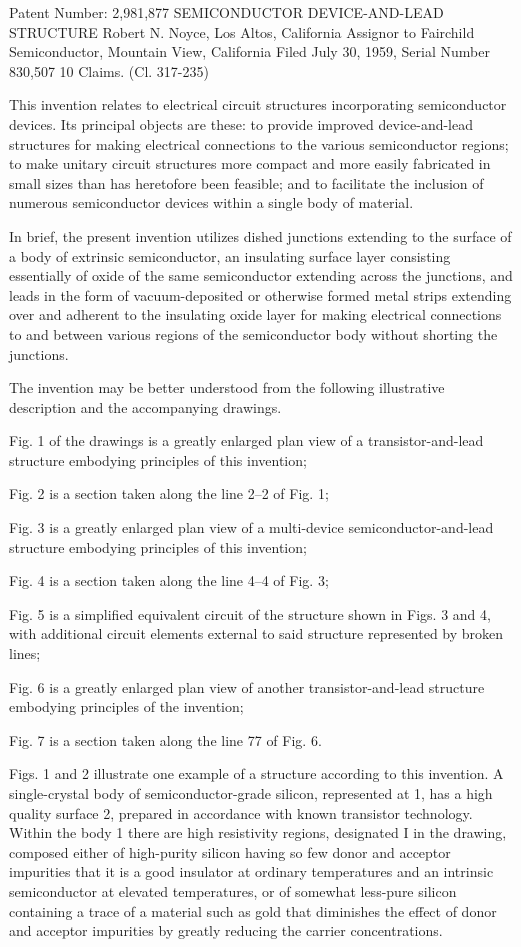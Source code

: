 Patent Number: 2,981,877
SEMICONDUCTOR DEVICE-AND-LEAD STRUCTURE
Robert N. Noyce, Los Altos, California
Assignor to Fairchild Semiconductor, Mountain View, California
Filed July 30, 1959, Serial Number 830,507
10 Claims. (Cl. 317-235)

This invention relates to electrical circuit structures incorporating semiconductor devices. Its principal objects are these: to provide improved device-and-lead structures for making electrical connections to the various semiconductor regions; to make unitary circuit structures more compact and more easily fabricated in small sizes than has heretofore been feasible; and to facilitate the inclusion of numerous semiconductor devices within a single body of material.

In brief, the present invention utilizes dished junctions extending to the surface of a body of extrinsic semiconductor, an insulating surface layer consisting essentially of oxide of the same semiconductor extending across the junctions, and leads in the form of vacuum-deposited or otherwise formed metal strips extending over and adherent to the insulating oxide layer for making electrical connections to and between various regions of the semiconductor body without shorting the junctions.

The invention may be better understood from the following illustrative description and the accompanying drawings.

Fig. 1 of the drawings is a greatly enlarged plan view of a transistor-and-lead structure embodying principles of this invention;

Fig. 2 is a section taken along the line 2--2 of Fig. 1;

Fig. 3 is a greatly enlarged plan view of a multi-device semiconductor-and-lead structure embodying principles of this invention;

Fig. 4 is a section taken along the line 4--4 of Fig. 3;

Fig. 5 is a simplified equivalent circuit of the structure shown in Figs. 3 and 4, with additional circuit elements external to said structure represented by broken lines;

Fig. 6 is a greatly enlarged plan view of another transistor-and-lead structure embodying principles of the invention;

Fig. 7 is a section taken along the line 77 of Fig. 6.

Figs. 1 and 2 illustrate one example of a structure according to this invention. A single-crystal body of semiconductor-grade silicon, represented at 1, has a high quality surface 2, prepared in accordance with known transistor technology. Within the body 1 there are high resistivity regions, designated I in the drawing, composed either of high-purity silicon having so few donor and acceptor impurities that it is a good insulator at ordinary temperatures and an intrinsic semiconductor at elevated temperatures, or of somewhat less-pure silicon containing a trace of a material such as gold that diminishes the effect of donor and acceptor impurities by greatly reducing the carrier concentrations.

